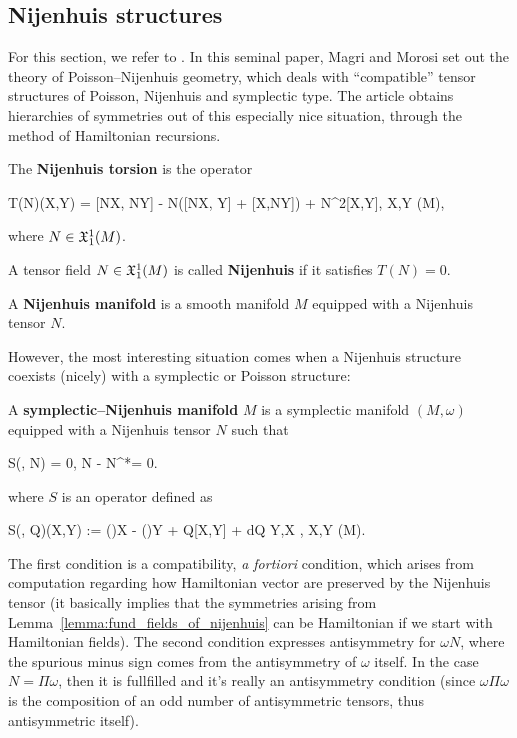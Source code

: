 \documentclass[main.tex]{subfiles}
\begin{document}
\subsection{Nijenhuis structures}
For this section, we refer to \cite{magri1984geometrical}. In this seminal paper, Magri and Morosi set out the theory of Poisson--Nijenhuis geometry, which deals with ``compatible'' tensor structures of Poisson, Nijenhuis and symplectic type. The article obtains hierarchies of symmetries out of this especially nice situation, through the method of Hamiltonian recursions.

\begin{definition}
	The \textbf{Nijenhuis torsion} is the operator
	\begin{eqalign}
		T(N)(X,Y) = [NX, NY] - N([NX, Y] + [X,NY]) + N^2[X,Y], \quad \forall X,Y \in \fields(M),
	\end{eqalign}
	where $N \in \mathfrak{X}^1_1(M)$.
\end{definition}

\begin{definition}
	A tensor field $N \in \mathfrak{X}^1_1(M)$ is called \textbf{Nijenhuis} if it satisfies $T(N) = 0$.
\end{definition}

\begin{definition}
	A \textbf{Nijenhuis manifold} is a smooth manifold $M$ equipped with a Nijenhuis tensor $N$.
\end{definition}

However, the most interesting situation comes when a Nijenhuis structure coexists (nicely) with a symplectic or Poisson structure:

\begin{definition}
	A \textbf{symplectic--Nijenhuis manifold} $M$ is a symplectic manifold $(M, \omega)$ equipped with a Nijenhuis tensor $N$ such that
	\begin{eqalign}
	\label{eq:symp_nijenhuis_conditions}
		S(\omega, N) = 0, \quad \omega N - N^*\omega = 0.
	\end{eqalign}
	where $S$ is an operator defined as
	\begin{eqalign}
		S(\eta, Q)(X,Y) := (\eta)X - (\eta)Y + \eta Q[X,Y] + d\langle \eta Q Y,X \rangle, \quad X,Y \in \fields(M).
	\end{eqalign}
\end{definition}

The first condition is a compatibility, \emph{a fortiori} condition, which arises from computation regarding how Hamiltonian vector are preserved by the Nijenhuis tensor (it basically implies that the symmetries arising from Lemma~\ref{lemma:fund_fields_of_nijenhuis} can be Hamiltonian if we start with Hamiltonian fields). The second condition expresses antisymmetry for $\omega N$, where the spurious minus sign comes from the antisymmetry of $\omega$ itself. In the case $N=\Pi\omega$, then it is fullfilled and it's really an antisymmetry condition (since $\omega\Pi\omega$ is the composition of an odd number of antisymmetric tensors, thus antisymmetric itself).
\end{document}
